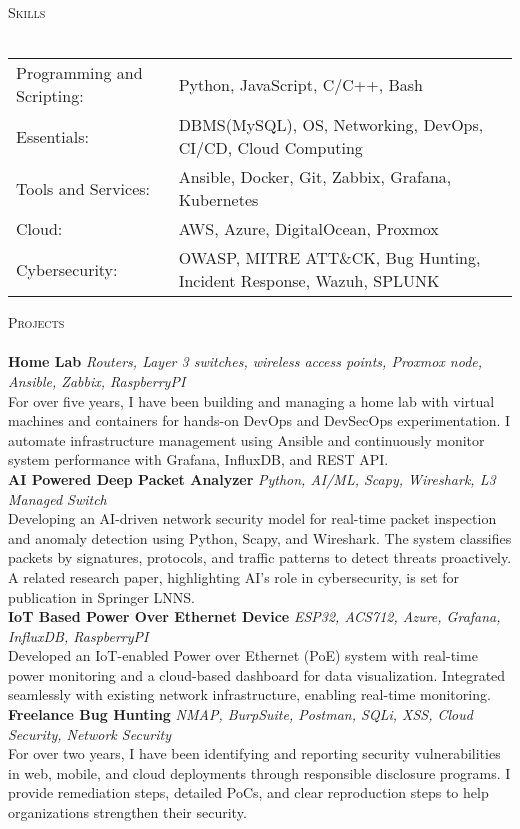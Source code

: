\documentclass[a4paper]{article}
\newcommand{\lineunder} {
    \vspace*{-8pt} \\
    \hspace*{-18pt} \hrulefill \\
}
\newcommand{\header} [1] {
    {\hspace*{-18pt}\vspace*{6pt} \textsc{#1}}
    \vspace*{-6pt} \lineunder
}
\begin{document}
\header{Skills}
\begin{tabular}{ l l }
	Programming and Scripting: & Python, JavaScript, C/C++, Bash                                     \\
	Essentials:                & DBMS(MySQL), OS, Networking, DevOps, CI/CD, Cloud Computing         \\
	Tools and Services:        & Ansible, Docker, Git, Zabbix, Grafana, Kubernetes                   \\
	Cloud:                     & AWS, Azure, DigitalOcean, Proxmox                                   \\
	Cybersecurity:             & OWASP, MITRE ATT\&CK, Bug Hunting, Incident Response, Wazuh, SPLUNK \\
\end{tabular}
\vspace{2mm}

\header{Projects}
{\textbf{Home Lab}} {\sl Routers, Layer 3 switches, wireless access points, Proxmox node, Ansible, Zabbix, RaspberryPI} \\
For over five years, I have been building and managing a home lab with virtual machines and containers for hands-on DevOps and DevSecOps experimentation. I automate infrastructure management using Ansible and continuously monitor system performance with Grafana, InfluxDB, and REST API.\\
\vspace*{2mm}
{\textbf{AI Powered Deep Packet Analyzer}} {\sl Python, AI/ML, Scapy, Wireshark, L3 Managed Switch} \\
Developing an AI-driven network security model for real-time packet inspection and anomaly detection using Python, Scapy, and Wireshark. The system classifies packets by signatures, protocols, and traffic patterns to detect threats proactively. A related research paper, highlighting AI’s role in cybersecurity, is set for publication in Springer LNNS.\\
\vspace*{2mm}
{\textbf{IoT Based Power Over Ethernet Device}} {\sl ESP32, ACS712, Azure, Grafana, InfluxDB, RaspberryPI} \\
Developed an IoT-enabled Power over Ethernet (PoE) system with real-time power monitoring and a cloud-based dashboard for data visualization. Integrated seamlessly with existing network infrastructure, enabling real-time monitoring.\\
\vspace*{2mm}
{\textbf{Freelance Bug Hunting}} {\sl NMAP, BurpSuite, Postman, SQLi, XSS, Cloud Security, Network Security} \\
For over two years, I have been identifying and reporting security vulnerabilities in web, mobile, and cloud deployments through responsible disclosure programs. I provide remediation steps, detailed PoCs, and clear reproduction steps to help organizations strengthen their security.\\
\vspace*{2mm}



\ 
\end{document}
